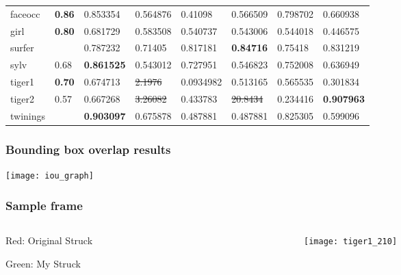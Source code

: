 \begin{frame}
\begin{center}
{\begin{tabular}{l l l l l l l l}
            faceocc          & \textbf{0.86} &         0.853354  &         0.564876  & 0.41098    &         0.566509  & 0.798702  &         0.660938  \\
            girl             & \textbf{0.80} &         0.681729  &         0.583508  & 0.540737   &         0.543006  & 0.544018  &         0.446575  \\
            surfer           &               &         0.787232  &         0.71405   & 0.817181   & \textbf{0.84716}  & 0.75418   &         0.831219  \\
            sylv             &         0.68  & \textbf{0.861525} &         0.543012  & 0.727951   &         0.546823  & 0.752008  &         0.636949  \\
            tiger1           & \textbf{0.70} &         0.674713  &   \sout{2.1976}   & 0.0934982  &         0.513165  & 0.565535  &         0.301834  \\
            tiger2           &         0.57  &         0.667268  &   \sout{3.26082}  & 0.433783   &  \sout{20.8434}   & 0.234416  & \textbf{0.907963} \\
            twinings         &               & \textbf{0.903097} &         0.675878  & 0.487881   &         0.487881  & 0.825305  &         0.599096  \\
            \bottomrule
        \end{tabular}}
    \end{center}
\end{frame}

\begin{frame}
    \frametitle{Bounding box overlap results}
    \begin{center}
        \texttt{[image: iou\_graph]}
    \end{center}
\end{frame}

\begin{frame}
    \frametitle{Sample frame}
    \begin{columns}[t]
        \begin{column}{0.25\textwidth}
            Red: Original Struck

            Green: My Struck
        \end{column}
        \begin{column}{0.75\textwidth}
            \begin{center}
                \texttt{[image: tiger1\_210]}
            \end{center}
        \end{column}
    \end{columns}
\end{frame}

